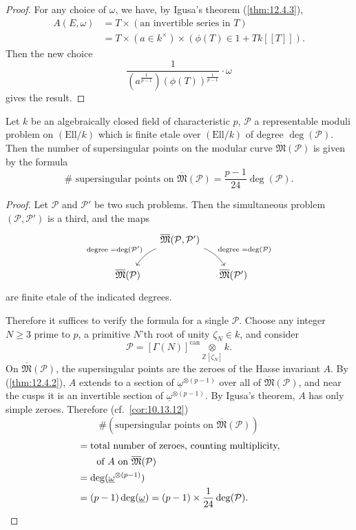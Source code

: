 \begin{proof}
For any choice of $\omega$, we have, by Igusa's theorem (\ref{thm:12.4.3}),
\[
\begin{aligned}
A(E,\omega) &= T \times (\text{an invertible series in } T) \\
&= T \times (a \in k^\times) \times (\phi(T) \in 1 + T k[[T]]) .
\end{aligned}
\]
Then the new choice
\[
\frac{1}{(a^{\frac{1}{p-1}})(\phi(T))^{\frac{1}{p-1}}} \cdot \omega
\]
gives the result.
\end{proof}

\begin{kthm}\label{thm:12.4.5}
Let $k$ be an algebraically closed field of characteristic $p$, $\mathcal{P}$ a representable moduli problem on $(\mathrm{Ell}/k)$ which is finite etale over $(\mathrm{Ell}/k)$ of degree $\deg(\mathcal{P})$. Then the number of supersingular points on the modular curve $\overline{\mathfrak{M}}(\mathcal{P})$ is given by the formula
\[
\# \text{ supersingular points on } \overline{\mathfrak{M}}(\mathcal{P}) = \frac{p-1}{24} \deg(\mathcal{P}) .
\]
\end{kthm}

\begin{proof}
Let $\mathcal{P}$ and $\mathcal{P}'$ be two such problems. Then the simultaneous problem $(\mathcal{P},\mathcal{P}')$ is a third, and the maps
\[
\begin{tikzcd}[row sep=1.8em, column sep=small]
& \overline{\mathfrak{M}}(\mathcal{P}, \mathcal{P}') \arrow[dl, bend right=15, "\text{degree } = \deg(\mathcal{P}')"'] \arrow[dr, bend left=15, "\text{degree } = \deg(\mathcal{P})"] & \\
\overline{\mathfrak{M}}(\mathcal{P}) & & \overline{\mathfrak{M}}(\mathcal{P}')
\end{tikzcd}
\]
are finite etale of the indicated degrees.

Therefore it suffices to verify the formula for a single $\mathcal{P}$. Choose any integer $N \ge 3$ prime to $p$, a primitive $N$'th root of unity $\zeta_N \in k$, and consider
\[
\mathcal{P} = [\Gamma(N)]^{\mathrm{can}} \underset{\mathbb{Z}[\zeta_N]}{\otimes} k .
\]
On $\overline{\mathfrak{M}}(\mathcal{P})$, the supersingular points are the zeroes of the Hasse invariant $A$. By (\ref{thm:12.4.2}), $A$ extends to a section of $\underline{\omega}^{\otimes (p-1)}$ over all of $\overline{\mathfrak{M}}(\mathcal{P})$, and near the cusps it is an invertible section of $\underline{\omega}^{\otimes (p-1)}$. By Igusa's theorem, $A$ has only simple zeroes. Therefore (cf.~\ref{cor:10.13.12})
\[
\# (\text{supersingular points on } \overline{\mathfrak{M}}(\mathcal{P}))
\]
\[
\begin{aligned}
&= \text{total number of zeroes, counting multiplicity,} \\
&\qquad \text{of } A \text{ on } \overline{\mathfrak{M}}(\mathcal{P}) \\
&= \deg(\underline{\omega}^{\otimes (p-1)}) \\
&= (p-1) \deg(\underline{\omega}) = (p-1) \times \frac{1}{24}\deg(\mathcal{P}) . \qedhere
\end{aligned}
\]
\end{proof}

